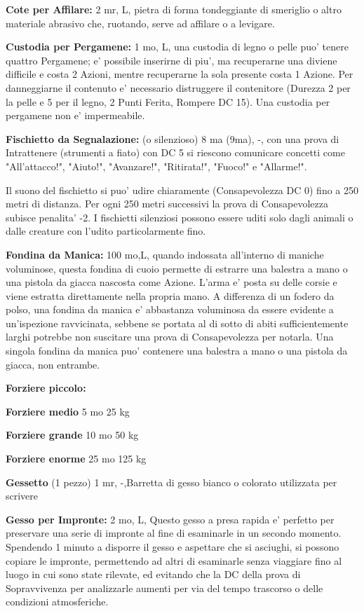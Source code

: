 \documentclass[a4paper,11pt,twoside,openany]{book}
\begin{document}
{\textbf{Cote per Affilare:} 2 mr, L, pietra di forma tondeggiante di smeriglio o altro materiale abrasivo che, ruotando, serve ad affilare o a levigare.

\textbf{Custodia per Pergamene:} 1 mo, L, una custodia di legno o pelle puo' tenere quattro Pergamene; e' possibile inserirne di piu', ma recuperarne una diviene difficile e costa 2 Azioni, mentre recuperarne la sola presente costa 1 Azione. Per danneggiarne il contenuto e' necessario distruggere il contenitore (Durezza 2 per la pelle e 5 per il legno, 2 Punti Ferita, Rompere DC 15). Una custodia per pergamene non e' impermeabile.

\textbf{Fischietto da Segnalazione:} (o silenzioso) 8 ma (9ma), -, con una prova di Intrattenere (strumenti a fiato) con DC 5 si riescono comunicare concetti come "All'attacco!", "Aiuto!", "Avanzare!", "Ritirata!", "Fuoco!" e "Allarme!".

Il suono del fischietto si puo' udire chiaramente (Consapevolezza DC 0) fino a 250 metri di distanza. Per ogni 250 metri successivi la prova di Consapevolezza subisce penalita' -2. I fischietti silenziosi possono essere uditi solo dagli animali o dalle creature con l'udito particolarmente fino.

\textbf{Fondina da Manica:} 100 mo,L, quando indossata all'interno di maniche voluminose, questa fondina di cuoio permette di estrarre una balestra a mano o una pistola da giacca nascosta come Azione. L'arma e' posta su delle corsie e viene estratta direttamente nella propria mano.
A differenza di un fodero da polso, una fondina da manica e' abbastanza voluminosa da essere evidente a un'ispezione ravvicinata, sebbene se portata al di sotto di abiti sufficientemente larghi potrebbe non suscitare una prova di Consapevolezza per notarla. Una singola fondina da manica puo' contenere una balestra a mano o una pistola da giacca, non entrambe.

\textbf{Forziere piccolo:}

\textbf{Forziere medio} 5 mo 25 kg

\textbf{Forziere grande} 10 mo 50 kg

\textbf{Forziere enorme} 25 mo 125 kg

\textbf{Gessetto} (1 pezzo) 1 mr, -,Barretta di gesso bianco o colorato utilizzata per scrivere

\textbf{Gesso per Impronte:} 2 mo, L, Questo gesso a presa rapida e' perfetto per preservare una serie di impronte al fine di esaminarle in un secondo momento. Spendendo 1 minuto a disporre il gesso e aspettare che si asciughi, si possono copiare le impronte, permettendo ad altri di esaminarle senza viaggiare fino al luogo in cui sono state rilevate, ed evitando che la DC della prova di Sopravvivenza per analizzarle aumenti per via del tempo trascorso o delle condizioni atmosferiche. 

}
\end{document}
